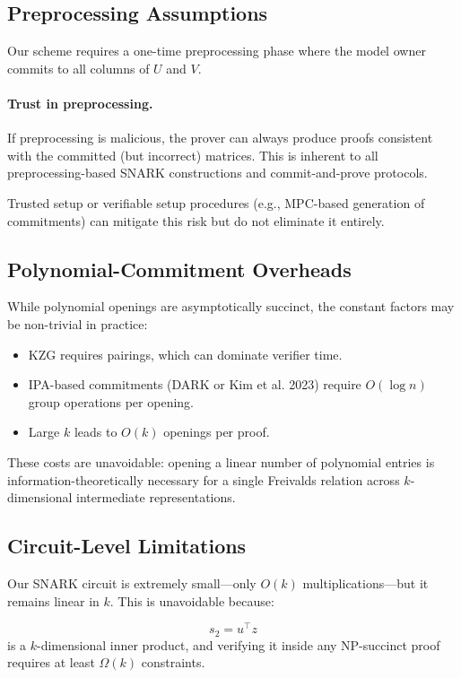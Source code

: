 \documentclass[11pt]{article}
\begin{document}
\subsection{Preprocessing Assumptions}

Our scheme requires a one-time preprocessing phase where the model
owner commits to all columns of $U$ and $V$.

\paragraph{Trust in preprocessing.}
If preprocessing is malicious, the prover can always produce proofs
consistent with the committed (but incorrect) matrices.  
This is inherent to all preprocessing-based SNARK constructions and
commit-and-prove protocols.

Trusted setup or verifiable setup procedures (e.g., MPC-based generation
of commitments) can mitigate this risk but do not eliminate it entirely.

\subsection{Polynomial-Commitment Overheads}

While polynomial openings are asymptotically succinct, the constant
factors may be non-trivial in practice:

\begin{itemize}
  \item KZG requires pairings, which can dominate verifier time.
  \item IPA-based commitments (DARK or Kim et al. 2023) require 
        $O(\log n)$ group operations per opening.
  \item Large $k$ leads to $O(k)$ openings per proof.
\end{itemize}

These costs are unavoidable: opening a linear number of polynomial
entries is information-theoretically necessary for a single Freivalds
relation across $k$-dimensional intermediate representations.

\subsection{Circuit-Level Limitations}

Our SNARK circuit is extremely small—only $O(k)$ multiplications—but it
remains linear in $k$.  
This is unavoidable because:

\[
  s_2 = u^\top z
\]
is a $k$-dimensional inner product, and verifying it inside any
NP-succinct proof requires at least $\Omega(k)$ constraints.
\end{document}
